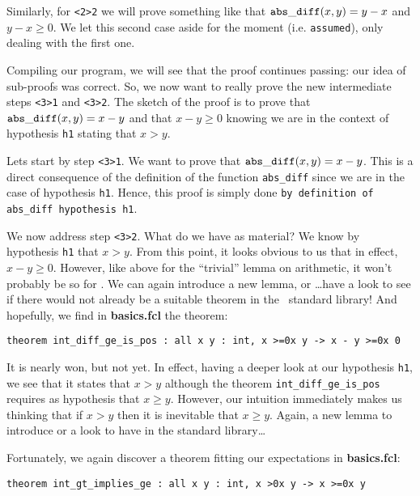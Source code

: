 \documentclass[11pt,a4paper,twoside,onecolumn,fullpage]{article}
\begin{document}
Similarly, for \lstinline"<2>2" we will prove something like that
${\tt abs\_diff} (x, y) = y - x$ and $y - x \ge 0$. We let this second case
aside for the moment (i.e. \lstinline"assumed"), only dealing with the
first one.

{\scriptsize
}

Compiling our program, we will see that the proof continues passing:
our idea of sub-proofs was correct. So, we now want to really prove
the new intermediate steps \lstinline"<3>1" and \lstinline"<3>2". The
sketch of the proof is to prove that ${\tt abs\_diff} (x, y) = x - y$ and
that $x - y \ge 0$ knowing we are in the context of hypothesis
\lstinline"h1" stating that $x > y$.

Lets start by step \lstinline"<3>1". We want to prove that
${\tt abs\_diff} (x, y) = x - y$.
This is a direct consequence of the definition of the function
\lstinline"abs_diff" since we are in the case of hypothesis
\lstinline"h1". Hence, this proof is simply done
\lstinline"by definition of abs_diff hypothesis h1".

We now address step \lstinline"<3>2".  What do we have as material? We
know by hypothesis \lstinline"h1" that $x>y$. From this point, it looks
obvious to us that in effect,  $x - y \ge 0$. However, like above for
the ``trivial'' lemma on arithmetic, it won't probably be so for
\zenon. We can again introduce a new lemma, or \ldots have a look to
see if there would not already be a suitable theorem in the \focal\
standard library! And hopefully, we find in \textbf{basics.fcl} the
theorem:

{\scriptsize
\begin{lstlisting}
theorem int_diff_ge_is_pos : all x y : int, x >=0x y -> x - y >=0x 0
\end{lstlisting}}

It is nearly won, but not yet. In effect, having a deeper look at our
hypothesis \lstinline"h1", we see that it states that $x > y$ although
the theorem \lstinline"int_diff_ge_is_pos" requires as hypothesis that
$x \ge y$. However, our intuition immediately makes us thinking that if
$x > y$ then it is inevitable that $x \ge y$. Again, a new lemma to
introduce or a look to have in the standard library\ldots

Fortunately, we again discover a theorem fitting our expectations in
\textbf{basics.fcl}:

{\scriptsize
\begin{lstlisting}
theorem int_gt_implies_ge : all x y : int, x >0x y -> x >=0x y
\end{lstlisting}}
\end{document}
